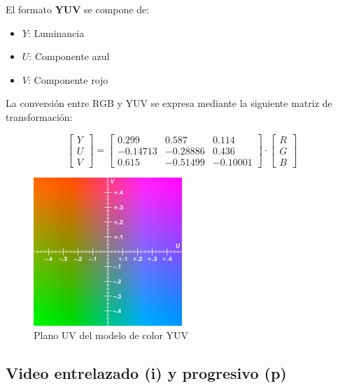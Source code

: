 \documentclass[11pt,a4paper]{article}
\begin{document}
El formato \textbf{YUV} se compone de:
\begin{itemize}
    \item $Y$: Luminancia
    \item $U$: Componente azul
    \item $V$: Componente rojo
\end{itemize}

La conversión entre RGB y YUV se expresa mediante la siguiente matriz de transformación:

\begin{equation}
\begin{bmatrix}
Y \\[6pt]
U \\[6pt]
V
\end{bmatrix}
=
\begin{bmatrix}
0.299 & 0.587   & 0.114 \\
-0.14713 & -0.28886 & 0.436 \\
0.615 & -0.51499 & -0.10001
\end{bmatrix}
\cdot
\begin{bmatrix}
R \\[6pt]
G \\[6pt]
B
\end{bmatrix}
\end{equation}

\begin{figure}[h!]
    \centering
    \includegraphics[width=0.5\textwidth]{resources/YUV_UV_plane.png}
    \caption{Plano UV del modelo de color YUV}
    \label{fig:yuv_uv_plane}
\end{figure}

\subsection{Video entrelazado (i) y progresivo (p)}
\end{document}
